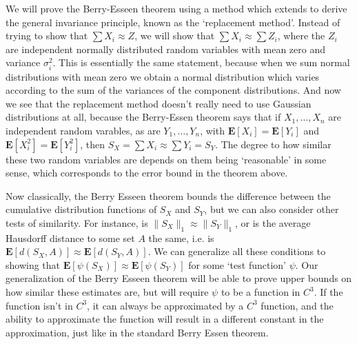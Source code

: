 We will prove the Berry-Esseen theorem using a method which extends to derive the general invariance principle, known as the `replacement method'. Instead of trying to show that $\sum X_i \approx Z$, we will show that $\sum X_i \approx \sum Z_i$, where the $Z_i$ are independent normally distributed random variables with mean zero and variance $\sigma_i^2$. This is essentially the same statement, because when we sum normal distributions with mean zero we obtain a normal distribution which varies according to the sum of the variances of the component distributions. And now we see that the replacement method doesn't really need to use Gaussian distributions at all, because the Berry-Essen theorem says that if $X_1, \dots, X_n$ are independent random varables, as are $Y_1, \dots, Y_n$, with $\mathbf{E}[X_i] = \mathbf{E}[Y_i]$ and $\mathbf{E}[X_i^2] = \mathbf{E}[Y_i^2]$, then $S_X = \sum X_i \approx \sum Y_i = S_Y$. The degree to how similar these two random variables are depends on them being `reasonable' in some sense, which corresponds to the error bound in the theorem above.

Now classically, the Berry Esseen theorem bounds the difference between the cumulative distribution functions of $S_X$ and $S_Y$, but we can also consider other tests of similarity. For instance, is $\| S_X \|_1 \approx \| S_Y \|_1$, or is the average Hausdorff distance to some set $A$ the same, i.e. is $\mathbf{E}[d(S_X,A)] \approx \mathbf{E}[d(S_Y,A)]$. We can generalize all these conditions to showing that $\mathbf{E}[\psi(S_X)] \approx \mathbf{E}[\psi(S_Y)]$ for some `test function' $\psi$. Our generalization of the Berry Esseen theorem will be able to prove upper bounds on how similar these estimates are, but will require $\psi$ to be a function in $C^3$. If the function isn't in $C^3$, it can always be approximated by a $C^3$ function, and the ability to approximate the function will result in a different constant in the approximation, just like in the standard Berry Essen theorem.

